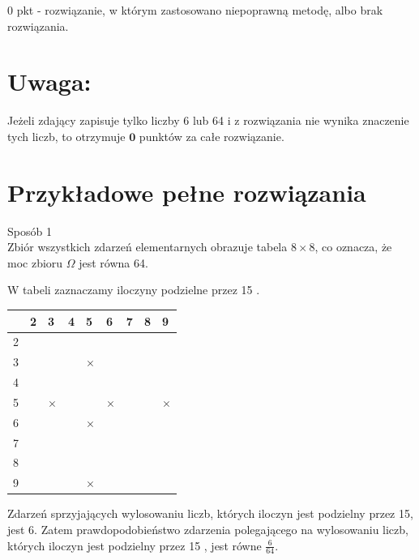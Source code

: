\documentclass[10pt]{article}
\begin{document}
0 pkt - rozwiązanie, w którym zastosowano niepoprawną metodę, albo brak rozwiązania.

\section*{Uwaga:}
Jeżeli zdający zapisuje tylko liczby 6 lub 64 i z rozwiązania nie wynika znaczenie tych liczb, to otrzymuje $\mathbf{0}$ punktów za całe rozwiązanie.

\section*{Przykładowe pełne rozwiązania}
Sposób 1\\
Zbiór wszystkich zdarzeń elementarnych obrazuje tabela $8 \times 8$, co oznacza, że moc zbioru $\Omega$ jest równa 64.

W tabeli zaznaczamy iloczyny podzielne przez 15 .

\begin{center}
\begin{tabular}{|l|l|l|l|l|l|l|l|l|}
\hline
 & 2 & 3 & 4 & 5 & 6 & 7 & 8 & 9 \\
\hline
2 &  &  &  &  &  &  &  &  \\
\hline
3 &  &  &  & $\times$ &  &  &  &  \\
\hline
4 &  &  &  &  &  &  &  &  \\
\hline
5 &  & $\times$ &  &  & $\times$ &  &  & $\times$ \\
\hline
6 &  &  &  & $\times$ &  &  &  &  \\
\hline
7 &  &  &  &  &  &  &  &  \\
\hline
8 &  &  &  &  &  &  &  &  \\
\hline
9 &  &  &  & $\times$ &  &  &  &  \\
\hline
\end{tabular}
\end{center}

Zdarzeń sprzyjających wylosowaniu liczb, których iloczyn jest podzielny przez 15, jest 6. Zatem prawdopodobieństwo zdarzenia polegającego na wylosowaniu liczb, których iloczyn jest podzielny przez 15 , jest równe $\frac{6}{64}$.
\end{document}
